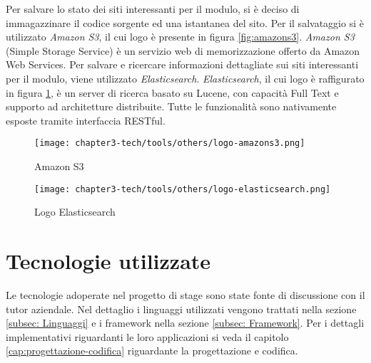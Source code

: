 \noindent
Per salvare lo stato dei siti interessanti per il modulo, si è deciso di immagazzinare il codice sorgente ed una istantanea del sito. Per il salvataggio si è utilizzato \emph{Amazon S3}, il cui logo è presente in figura \ref{fig:amazons3}. \emph{Amazon S3} (Simple Storage Service) è un servizio web di memorizzazione offerto da Amazon Web Services.\newline{} Per salvare e ricercare informazioni dettagliate sui siti interessanti per il modulo, viene utilizzato \emph{Elasticsearch}. \emph{Elasticsearch}, il cui logo è raffigurato in figura \ref{fig:elasticsearch}, è un server di ricerca basato su Lucene, con capacità Full Text e supporto ad architetture distribuite. Tutte le funzionalità sono nativamente esposte tramite interfaccia RESTful.
\begin{figure}[!h]
    \begin{minipage}{.5\textwidth} 
        \centering 
        \texttt{[image: chapter3-tech/tools/others/logo-amazons3.png]} 
        \caption{Amazon S3} 
        \label{fig:amazons3} 
    \end{minipage}%
    \begin{minipage}{.5\textwidth} 
        \centering 
        \texttt{[image: chapter3-tech/tools/others/logo-elasticsearch.png]} 
        \caption{Logo Elasticsearch} 
        \label{fig:elasticsearch} 
    \end{minipage}%
\end{figure} 

\section{Tecnologie utilizzate}
Le tecnologie adoperate nel progetto di stage sono state fonte di discussione con il tutor aziendale. Nel dettaglio i linguaggi utilizzati vengono trattati nella sezione \ref{subsec: Linguaggi} e i framework nella sezione \ref{subsec: Framework}. Per i dettagli implementativi riguardanti le loro applicazioni si veda il capitolo \ref{cap:progettazione-codifica} riguardante la progettazione e codifica.
